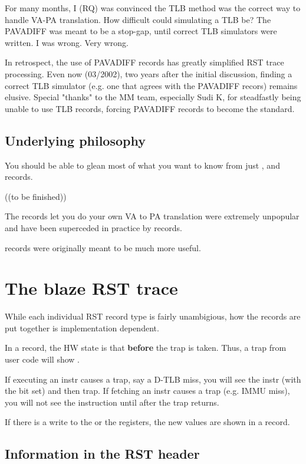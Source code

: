 \documentclass[10pt]{article}
\begin{document}
For many months, I (RQ) was convinced the TLB method was the correct way
to handle VA-PA translation.  How difficult could simulating a TLB be?
The PAVADIFF was meant to be a stop-gap, until correct TLB simulators
were written.  I was wrong.  Very wrong.

In retrospect, the use of PAVADIFF records has greatly simplified RST
trace processing.  Even now (03/2002), two years after the initial
discussion, finding a correct TLB simulator (e.g. one that agrees with
the PAVADIFF recors) remains elusive.  Special "thanks" to the MM team,
especially Sudi K, for steadfastly being unable to use TLB records,
forcing PAVADIFF records to become the standard.

\subsection{Underlying philosophy}

You should be able to glean most of what you want to know from just
,  and  records.

((to be finished))

The  records let you do your own VA to PA translation
were extremely unpopular and have been superceded in practice by
 records.

 records were originally meant to be much more useful.

\section{The blaze RST trace}

While each individual RST record type is fairly unambigious, how the
records are put together is implementation dependent.  

In a  record, the HW state is that \textbf{before} the
trap is taken.  Thus, a trap from user code will show .

If executing an instr causes a trap, say a D-TLB miss, you will see the
instr (with the  bit set) and then trap.  If fetching an
instr causes a trap (e.g. IMMU miss), you will not see the instruction
until after the trap returns.

If there is a write to the  or the  registers,
the new values are shown in a  record.

\subsection{Information in the RST header}
\end{document}
